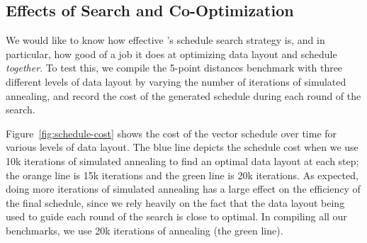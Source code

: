 \subsection{Effects of Search and Co-Optimization}\label{sec:search-and-cooptimization}
We would like to know how effective \system's schedule search strategy is, and in particular, how good of a job it does at optimizing data layout and schedule {\em together}.
To test this, we compile the 5-point distances benchmark with three different levels of data layout by varying the number of iterations of simulated annealing, and record the cost of the generated schedule during each round of the search.

Figure~\ref{fig:schedule-cost} shows the cost of the vector schedule over time for various levels of data layout.
The blue line depicts the schedule cost when we use 10k iterations of simulated annealing to find an optimal data layout at each step; the orange line is 15k iterations and the green line is 20k iterations.
As expected, doing more iterations of simulated annealing has a large effect on the efficiency of the final schedule, since we rely heavily on the fact that the data layout being used to guide each round of the search is close to optimal.
In compiling all our benchmarks, we use 20k iterations of annealing (the green line).





